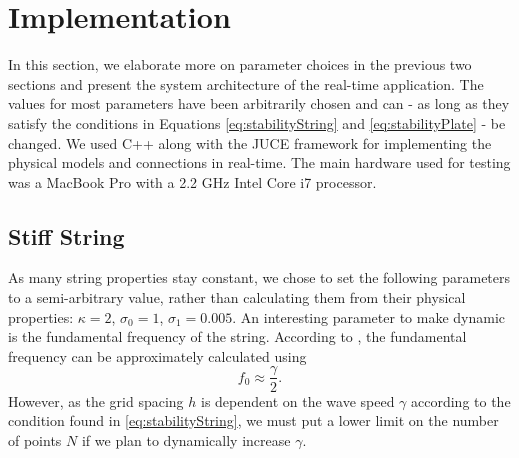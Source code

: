 \documentclass{article}
\begin{document}
\section{Implementation}\label{sec:implementation}
In this section, we elaborate more on parameter choices in the previous two sections and present the system architecture of the real-time application. The values for most parameters have been arbitrarily chosen and can - as long as they satisfy the conditions in Equations \eqref{eq:stabilityString} and \eqref{eq:stabilityPlate} - be changed. We used C++ along with the JUCE framework \cite{JUCE2019} for implementing the physical models and connections in real-time. The main hardware used for testing was a MacBook Pro with a 2.2 GHz Intel Core i7 processor.

\subsection{Stiff String}

As many string properties stay constant, we chose to set the following parameters to a semi-arbitrary value, rather than calculating them from their physical properties: $
\kappa = 2$, $\sigma_0 = 1$, $\sigma_1 = 0.005$. An interesting parameter to make dynamic is the fundamental frequency of the string. According to \cite{Bilbao2009:NumericalSoundSynthesis},  the fundamental frequency can be approximately calculated using
\begin{equation}
    f_0 \approx \frac{\gamma}{2}.
\end{equation}
However, as the grid spacing $h$ is dependent on the wave speed $\gamma$ according to the condition found in \eqref{eq:stabilityString}, we must put a lower limit on the number of points $N$ if we plan to dynamically increase $\gamma$.
\end{document}
